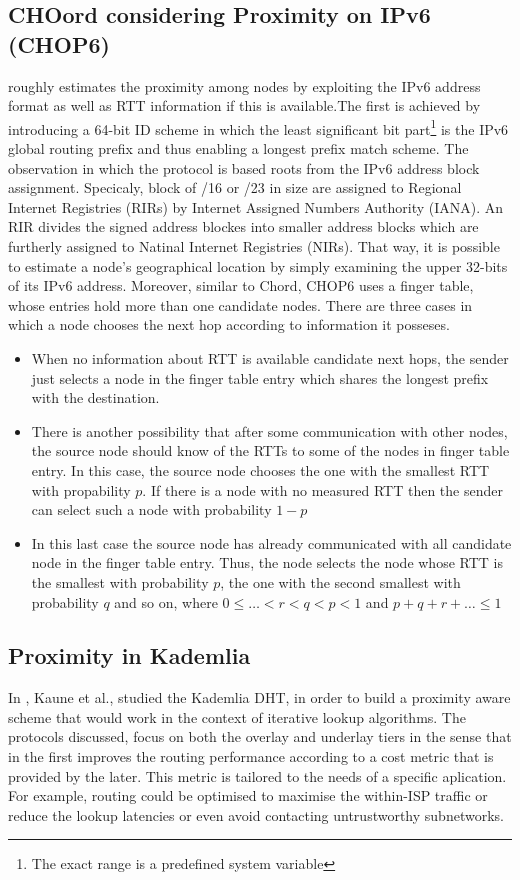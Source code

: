 \documentclass[a4paper,10pt]{article}
\begin{document}
\subsection{CHOord considering Proximity on IPv6 (CHOP6)}
\cite{morimoto_chop6_2007} roughly estimates the proximity among nodes by exploiting the IPv6 address format as well as RTT information if this is available.The first is achieved by introducing a 64-bit ID scheme in which the least significant bit part\footnote{The exact range is a predefined system variable} is the IPv6 global routing prefix and thus enabling a longest prefix match scheme. The observation in which the protocol is based roots from the IPv6 address block assignment. Specicaly, block of /16 or /23 in size are assigned to Regional Internet Registries (RIRs) by Internet Assigned Numbers Authority (IANA). An RIR divides the signed address blockes into smaller address blocks which are furtherly assigned to Natinal Internet Registries (NIRs). That way, it is possible to estimate a node's geographical location by simply examining the upper 32-bits of its IPv6 address. Moreover, similar to Chord, CHOP6 uses a finger table, whose entries hold more than one candidate nodes. There are three cases in which a node chooses the next hop according to information it posseses.
\begin{itemize}
 \item When no information about RTT is available candidate next hops, the sender just selects a node in the finger table entry which shares the longest prefix with the destination.
 \item There is another possibility that after some communication with other nodes, the source node should know of the RTTs to some of the nodes in finger table entry. In this case, the source node chooses the one with the smallest RTT with propability $p$. If there is a node with no measured RTT then the sender can select such a node with probability $1 - p$
 \item In this last case the source node has already communicated with all candidate node in the finger table entry. Thus, the node selects the node whose RTT is the smallest with probability $p$, the one with the second smallest with probability $q$ and so on, where $0 \leq \ldots < r < q < p < 1$ and $p+q+r+\ldots \leq 1$
\end{itemize}

\subsection{Proximity in Kademlia}
In \cite{kaune_pkad_2008}, Kaune et al., studied the Kademlia DHT, in order to build a proximity aware scheme that would work in the context of iterative lookup algorithms. The protocols discussed, focus on both the overlay and underlay tiers in the sense that in the first improves the routing performance according to a cost metric that is provided by the later. This metric is tailored to the needs of a specific aplication. For example, routing could be optimised to maximise the within-ISP traffic or reduce the lookup latencies or even avoid contacting untrustworthy subnetworks.
\end{document}
